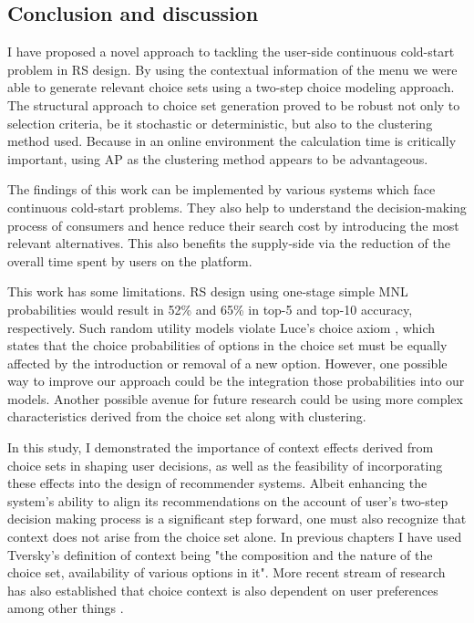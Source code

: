 \documentclass[a4paper,12pt]{article}
\newcommand{\citeyearonly}[1]{\citeyearpar{#1}}
\begin{document}
\subsection{Conclusion and discussion}

I have proposed a novel approach to tackling the user-side continuous cold-start problem in RS design. By using the contextual information of the menu we were able to generate relevant choice sets using a two-step choice modeling approach. The structural 
approach to choice set generation proved to be robust not only to selection criteria, be it stochastic or deterministic, but also to the clustering method used. Because in an online environment the calculation time is critically important, using AP as the clustering method appears to be advantageous.

The findings of this work can be implemented by various systems which face continuous cold-start problems. They also help to understand the decision-making process of consumers and hence reduce their search cost by introducing the most relevant alternatives. This also benefits the supply-side via the reduction of the overall time spent by users on the platform.

This work has some limitations. RS design using one-stage simple MNL probabilities would result in 52\% and 65\% in top-5 and top-10 accuracy, respectively. Such random utility models violate Luce's choice axiom \citep{luce2012individual}, which states that the choice probabilities of options in the choice set must be equally affected by the introduction or removal of a new option. However, one possible way to improve our approach could be the integration those probabilities into our models. Another possible avenue for future research could be using more complex characteristics derived from the choice set along with clustering.


In this study, I demonstrated the importance of context effects derived from choice sets in shaping user decisions, as well as the feasibility of incorporating these effects into the design of recommender systems.
Albeit enhancing the system's ability to align its recommendations on the account of user's two-step decision making process is a significant step forward, one must also recognize that context does not arise from the choice set alone. In previous chapters I have used Tversky's \citeyearonly{tversky1972elimination} definition of context being "the composition  and the nature of the choice set, availability of various options in it". More recent stream of research has also established that choice context is also dependent on user preferences among other things \citep{adomavicius2011context, dey2001understanding}.
\end{document}
